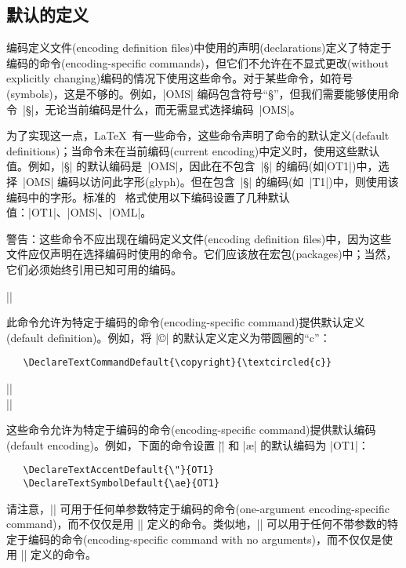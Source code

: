 \documentclass{ltxguide}[1995/11/28]
\newcommand{\heiti}{\CJKfamily{heiti}} %
\newcommand{\kaiti}{\CJKfamily{kaiti}} %
\begin{document}
\subsection[默认的定义]{\heiti 默认的定义}

编码定义文件(encoding definition files)中使用的声明(declarations)定义了特定于编码的命令(encoding-specific commands)，但它们不允许在不显式更改(without explicitly changing)编码的情况下使用这些命令。对于某些命令，如符号(symbols)，这是不够的。例如，|OMS| 编码包含符号“\S”，但我们需要能够使用命令~|\S|，无论当前编码是什么，而无需显式选择编码~|OMS|。

为了实现这一点，\LaTeX{}\ 有一些命令，这些命令声明了命令的默认定义(default definitions)；当命令未在当前编码(current encoding)中定义时，使用这些默认值。例如，|\S| 的默认编码是~|OMS|，因此在不包含~|\S| 的编码(如|OT1|)中，选择~|OMS| 编码以访问此字形(glyph)。但在包含~|\S| 的编码(如~|T1|)中，则使用该编码中的字形。标准的 \LaTeXe{}\ 格式使用以下编码设置了几种默认值：|OT1|、|OMS|、|OML|。

{\kaiti 警告}：这些命令{\kaiti 不}应出现在编码定义文件(encoding definition files)中，因为这些文件应仅声明在选择编码时使用的命令。它们应该放在宏包(packages)中；当然，它们必须始终引用已知可用的编码。

\begin{decl}[1994/12/01]
  |\DeclareTextCommandDefault|  
\end{decl}
此命令允许为特定于编码的命令(encoding-specific command)提供默认定义(default definition)。例如，将 |\copyright| 的默认定义定义为带圆圈的“c”：
\begin{verbatim}
   \DeclareTextCommandDefault{\copyright}{\textcircled{c}}
\end{verbatim}
\begin{decl}[1994/12/01]
  |\DeclareTextAccentDefault|   \\
  |\DeclareTextSymbolDefault|  
\end{decl}
这些命令允许为特定于编码的命令(encoding-specific command)提供默认编码(default encoding)。例如，下面的命令设置 |\"| 和 |\ae| 的默认编码为 |OT1|：
\begin{verbatim}
   \DeclareTextAccentDefault{\"}{OT1}
   \DeclareTextSymbolDefault{\ae}{OT1}
\end{verbatim}
请注意，|\DeclareTextAccentDefault| 可用于任何单参数特定于编码的命令(one-argument encoding-specific command)，而不仅仅是用 |\DeclareTextAccent| 定义的命令。类似地，|\DeclareTextSymbolDefault| 可以用于任何不带参数的特定于编码的命令(encoding-specific command with no arguments)，而不仅仅是使用 |\DeclareTextSymbol| 定义的命令。
\end{document}
